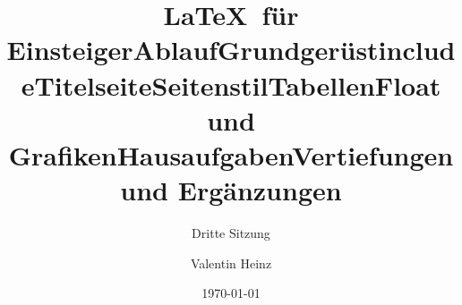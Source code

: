 \documentclass[]{beamer}
\date{}
\author{Valentin Heinz}
\title{\LaTeX \ für Einsteiger}
\subtitle{Dritte Sitzung}
\date{\today}
\begin{document}
\maketitle

\title{Ablauf}


\title{Grundgerüst}


\title{include}


\title{Titelseite}


\title{Seitenstil}


\title{Tabellen}


\title{Float und Grafiken}


\title{Hausaufgaben}



\title{Vertiefungen und Ergänzungen}
\end{document}
